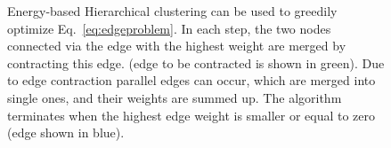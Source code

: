 \begin{center}
\begin{figure}[t]
\begin{center}
{\begin{tikzpicture}
    \end{tikzpicture}


}
\caption{
    Energy-based Hierarchical clustering can be used to greedily optimize
    Eq.~\ref{eq:edgeproblem}.
    In each step, the two nodes connected via the edge with 
    the highest weight are merged by contracting this edge.
    (edge to be contracted is shown in green).
    Due to edge contraction parallel edges can occur, which 
    are merged into single ones, and their weights are summed up.
    The algorithm terminates when the highest edge weight is smaller
    or equal to zero (edge shown in blue).
}\label{fig:hc_alg}
\end{center}
\end{figure}
\end{center}



